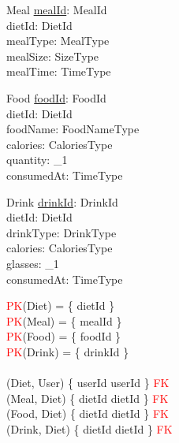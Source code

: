 \documentclass{article}
\begin{document}
\vspace{-0.75cm}
\begin{schema}{Meal}
	\underline{mealId}: MealId \\
    dietId: DietId \\
    mealType: MealType \\
    mealSize: SizeType \\
    mealTime: TimeType \\
\end{schema}
\vspace{-0.75cm}
\begin{schema}{Food}
	\underline{foodId}: FoodId \\
    dietId: DietId \\
    foodName: FoodNameType \\
    calories: CaloriesType \\
    quantity: \nat_1 \\
    consumedAt: TimeType \\
\end{schema}
\vspace{-0.75cm}
\begin{schema}{Drink}
	\underline{drinkId}: DrinkId \\
    dietId: DietId \\
    drinkType: DrinkType \\
    calories: CaloriesType \\
    glasses: \nat_1 \\
    consumedAt: TimeType \\
\end{schema}
\begin{zed}
\textcolor{red}{PK}(Diet) = \{ dietId \} \\
\textcolor{red}{PK}(Meal) = \{ mealId \} \\
\textcolor{red}{PK}(Food) = \{ foodId \} \\
\textcolor{red}{PK}(Drink) = \{ drinkId \} \\
\newline \\ 
(Diet, User) \mapsto \{ userId \mapsto userId \} \in \textcolor{red}{FK} \\
(Meal, Diet) \mapsto \{ dietId \mapsto dietId \} \in \textcolor{red}{FK} \\
(Food, Diet) \mapsto \{ dietId \mapsto dietId \} \in \textcolor{red}{FK} \\
(Drink, Diet) \mapsto \{ dietId \mapsto dietId \} \in \textcolor{red}{FK} \\
\end{zed}
\end{document}

